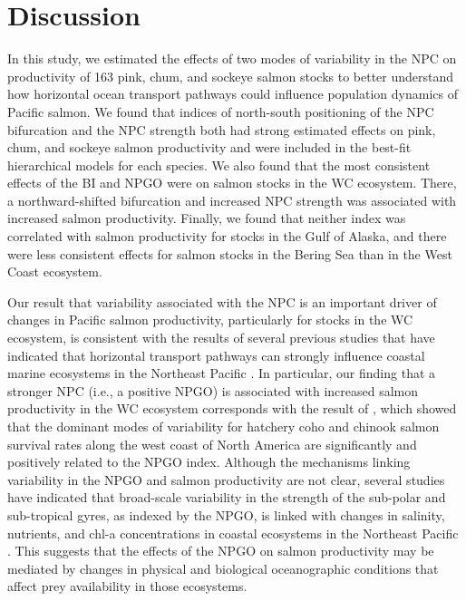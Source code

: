 \section{Discussion}

In this study, we estimated the effects of two modes of variability in the NPC
on productivity of 163 pink, chum, and sockeye salmon stocks to better
understand how horizontal ocean transport pathways could influence population
dynamics of Pacific salmon. We found that indices of north-south positioning of
the NPC bifurcation and the NPC strength both had strong estimated effects on
pink, chum, and sockeye salmon productivity and were included in the best-fit
hierarchical models for each species. We also found that the most consistent
effects of the BI and NPGO were on salmon stocks in the WC ecosystem. There, a
northward-shifted bifurcation and increased NPC strength was associated with
increased salmon productivity. Finally, we found that neither index was
correlated with salmon productivity for stocks in the Gulf of Alaska, and there
were less consistent effects for salmon stocks in the Bering Sea than in the
West Coast ecosystem.

Our result that variability associated with the NPC is an important driver of
changes in Pacific salmon productivity, particularly for stocks in the WC
ecosystem, is consistent with the results of several previous studies that have
indicated that horizontal transport pathways can strongly influence coastal
marine ecosystems in the Northeast Pacific \citep{Kilduff2015, Sydeman2011a,
Batten2007a}. In particular, our finding that a stronger NPC (i.e., a positive
NPGO) is associated with increased salmon productivity in the WC ecosystem
corresponds with the result of \citet{Kilduff2015}, which showed that the
dominant modes of variability for hatchery coho and chinook salmon survival
rates along the west coast of North America are significantly and positively
related to the NPGO index. Although the mechanisms linking variability in the
NPGO and salmon productivity are not clear, several studies have indicated that
broad-scale variability in the strength of the sub-polar and sub-tropical gyres,
as indexed by the NPGO, is linked with changes in salinity, nutrients, and chl-a
concentrations in coastal ecosystems in the Northeast Pacific
\citep{Di-Lorenzo2008a, Chenillat2012}. This suggests that the effects of the
NPGO on salmon productivity may be mediated by changes in physical and
biological oceanographic conditions that affect prey availability in those
ecosystems.

